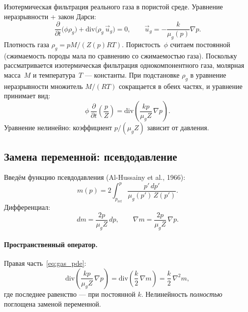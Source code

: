 ﻿\documentclass[12pt,a4paper]{article}
\begin{document}
Изотермическая фильтрация реального газа в пористой среде.
Уравнение неразрывности + закон Дарси:
\begin{equation}\label{eq:gas_cont}
  \frac{\partial}{\partial t}\bigl(\phi\rho_g\bigr)
  + \mathrm{div}\bigl(\rho_g\,\vec{u}_g\bigr) = 0,
  \qquad
  \vec{u}_g = -\frac{k}{\mu_g(p)}\nabla p.
\end{equation}
Плотность газа $\rho_g = pM/(Z(p)RT)$. Пористость~$\phi$ считаем
постоянной (сжимаемость породы мала по сравнению со сжимаемостью газа).
Поскольку рассматривается изотермическая фильтрация однокомпонентного
газа, молярная масса~$M$ и температура~$T$ --- константы. При подстановке
$\rho_g$ в уравнение неразрывности множитель $M/(RT)$ сокращается
в обеих частях, и уравнение принимает вид:
\begin{equation}\label{eq:gas_pde}
  \phi\,\frac{\partial}{\partial t}\left(\frac{p}{Z}\right)
  = \mathrm{div}\left(\frac{kp}{\mu_g Z}\,\nabla p\right).
\end{equation}
Уравнение нелинейно: коэффициент $p/(\mu_g Z)$ зависит от давления.

\subsection{Замена переменной: псевдодавление}\label{ssec:pseudo_p}

Введём функцию псевдодавления (Al-Hussainy et al., 1966):
\begin{equation}\label{eq:mdef_gas}
  \boxed{m(p) = 2\int_{p_{\mathrm{ref}}}^{p}
         \frac{p'\,dp'}{\mu_g(p')\,Z(p')}.}
\end{equation}
Дифференциал:
\begin{equation}\label{eq:dm_gas}
  dm = \frac{2p}{\mu_g Z}\,dp,
  \qquad \nabla m = \frac{2p}{\mu_g Z}\,\nabla p.
\end{equation}

\paragraph{Пространственный оператор.}
Правая часть~\eqref{eq:gas_pde}:
\begin{equation}\label{eq:rhs_gas}
  \mathrm{div}\left(\frac{kp}{\mu_g Z}\,\nabla p\right)
  = \mathrm{div}\left(\frac{k}{2}\,\nabla m\right)
  = \frac{k}{2}\,\nabla^2 m,
\end{equation}
где последнее равенство --- при постоянной $k$. Нелинейность
\emph{полностью} поглощена заменой переменной.
\end{document}
